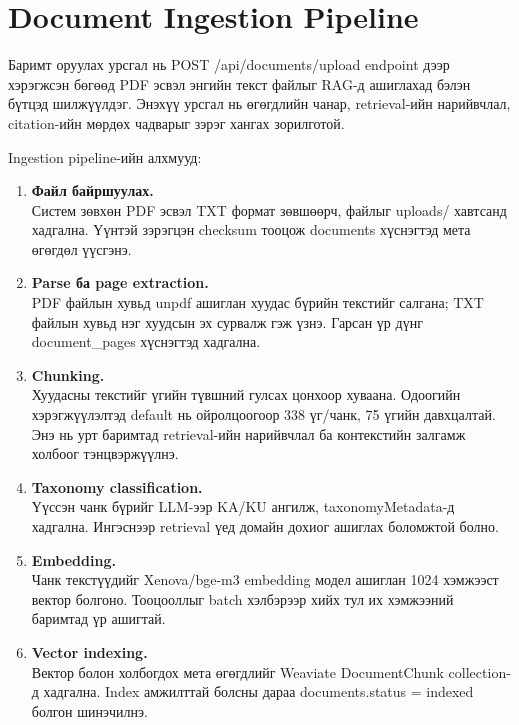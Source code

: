 \documentclass[12pt,A4]{report}
\newcommand{\eng}[1]{#1}
\begin{document}
\section{Document Ingestion Pipeline}

Баримт оруулах урсгал нь \eng{POST /api/documents/upload} endpoint дээр хэрэгжсэн бөгөөд PDF эсвэл энгийн текст файлыг RAG-д ашиглахад бэлэн бүтцэд шилжүүлдэг. Энэхүү урсгал нь өгөгдлийн чанар, retrieval-ийн нарийвчлал, citation-ийн мөрдөх чадварыг зэрэг хангах зорилготой.

Ingestion pipeline-ийн алхмууд:

\begin{enumerate}
    \item \textbf{Файл байршуулах.} \\
    Систем зөвхөн PDF эсвэл TXT формат зөвшөөрч, файлыг \eng{uploads/} хавтсанд хадгална. Үүнтэй зэрэгцэн \eng{checksum} тооцож \eng{documents} хүснэгтэд мета өгөгдөл үүсгэнэ.

    \item \textbf{Parse ба page extraction.} \\
    PDF файлын хувьд \eng{unpdf} ашиглан хуудас бүрийн текстийг салгана; TXT файлын хувьд нэг хуудсын эх сурвалж гэж үзнэ. Гарсан үр дүнг \eng{document\_pages} хүснэгтэд хадгална.

    \item \textbf{Chunking.} \\
    Хуудасны текстийг үгийн түвшний гулсах цонхоор хуваана. Одоогийн хэрэгжүүлэлтэд default нь ойролцоогоор 338 үг/чанк, 75 үгийн давхцалтай. Энэ нь урт баримтад retrieval-ийн нарийвчлал ба контекстийн залгамж холбоог тэнцвэржүүлнэ.

    \item \textbf{Taxonomy classification.} \\
    Үүссэн чанк бүрийг LLM-ээр KA/KU ангилж, \eng{taxonomyMetadata}-д хадгална. Ингэснээр retrieval үед домайн дохиог ашиглах боломжтой болно.

    \item \textbf{Embedding.} \\
    Чанк текстүүдийг \eng{Xenova/bge-m3} embedding модел ашиглан 1024 хэмжээст вектор болгоно. Тооцооллыг batch хэлбэрээр хийх тул их хэмжээний баримтад үр ашигтай.

    \item \textbf{Vector indexing.} \\
    Вектор болон холбогдох мета өгөгдлийг \eng{Weaviate DocumentChunk} collection-д хадгална. Index амжилттай болсны дараа \eng{documents.status = indexed} болгон шинэчилнэ.
\end{enumerate}
\end{document}
